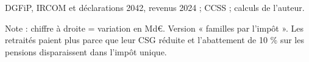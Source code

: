 DGFiP, IRCOM et déclarations 2042, revenus 2024 ; CCSS ; calculs de l'auteur.\par Note : chiffre à droite = variation en Md\euro{}. Version « familles par l'impôt ». Les retraités paient plus parce que leur CSG réduite et l'abattement de 10 \% sur les pensions disparaissent dans l'impôt unique.
